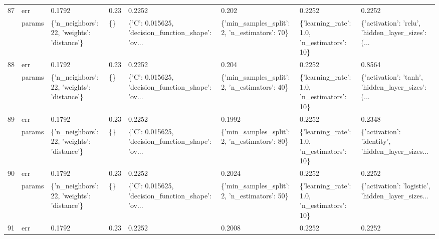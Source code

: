 \begin{tabular}{llllllll}
87  & err &                                      0.1792 &    0.23 &                                             0.2252 &                                          0.202 &                                       0.2252 &                                             0.2252 \\
    & params &  \{'n\_neighbors': 22, 'weights': 'distance'\} &      \{\} &  \{'C': 0.015625, 'decision\_function\_shape': 'ov... &   \{'min\_samples\_split': 2, 'n\_estimators': 70\} &   \{'learning\_rate': 1.0, 'n\_estimators': 10\} &  \{'activation': 'relu', 'hidden\_layer\_sizes': (... \\
88  & err &                                      0.1792 &    0.23 &                                             0.2252 &                                          0.204 &                                       0.2252 &                                             0.8564 \\
    & params &  \{'n\_neighbors': 22, 'weights': 'distance'\} &      \{\} &  \{'C': 0.015625, 'decision\_function\_shape': 'ov... &   \{'min\_samples\_split': 2, 'n\_estimators': 40\} &   \{'learning\_rate': 1.0, 'n\_estimators': 10\} &  \{'activation': 'tanh', 'hidden\_layer\_sizes': (... \\
89  & err &                                      0.1792 &    0.23 &                                             0.2252 &                                         0.1992 &                                       0.2252 &                                             0.2348 \\
    & params &  \{'n\_neighbors': 22, 'weights': 'distance'\} &      \{\} &  \{'C': 0.015625, 'decision\_function\_shape': 'ov... &   \{'min\_samples\_split': 2, 'n\_estimators': 80\} &   \{'learning\_rate': 1.0, 'n\_estimators': 10\} &  \{'activation': 'identity', 'hidden\_layer\_sizes... \\
90  & err &                                      0.1792 &    0.23 &                                             0.2252 &                                         0.2024 &                                       0.2252 &                                             0.2252 \\
    & params &  \{'n\_neighbors': 22, 'weights': 'distance'\} &      \{\} &  \{'C': 0.015625, 'decision\_function\_shape': 'ov... &   \{'min\_samples\_split': 2, 'n\_estimators': 50\} &   \{'learning\_rate': 1.0, 'n\_estimators': 10\} &  \{'activation': 'logistic', 'hidden\_layer\_sizes... \\
91  & err &                                      0.1792 &    0.23 &                                             0.2252 &                                         0.2008 &                                       0.2252 &                                             0.2252 \\

\end{tabular}
